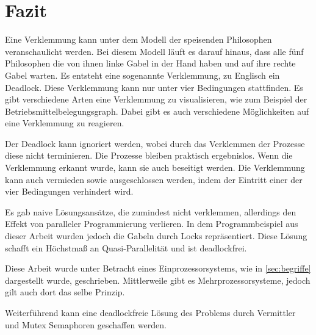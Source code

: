 \chapter{Fazit}
\label{fazit}

Eine Verklemmung kann unter dem Modell der speisenden Philosophen veranschaulicht werden. Bei diesem Modell läuft es darauf hinaus, dass alle fünf Philosophen die von ihnen linke Gabel in der Hand haben und auf ihre rechte Gabel warten. Es entsteht eine sogenannte Verklemmung, zu Englisch ein Deadlock. Diese Verklemmung kann nur unter vier Bedingungen stattfinden. Es gibt verschiedene Arten eine Verklemmung zu visualisieren, wie zum Beispiel der Betriebsmittelbelegungsgraph. Dabei gibt es auch verschiedene Möglichkeiten auf eine Verklemmung zu reagieren. 

Der Deadlock kann ignoriert werden, wobei durch das Verklemmen der Prozesse diese nicht terminieren. Die Prozesse bleiben praktisch ergebnislos. 
Wenn die Verklemmung erkannt wurde, kann sie auch beseitigt werden.
Die Verklemmung kann auch vermieden sowie ausgeschlossen werden, indem der Eintritt einer der vier Bedingungen verhindert wird.

Es gab naive Lösungsansätze, die zumindest nicht verklemmen, allerdings den Effekt von paralleler Programmierung verlieren. 
In dem Programmbeispiel aus dieser Arbeit wurden jedoch die Gabeln durch Locks repräsentiert. Diese Lösung schafft ein Höchstmaß an Quasi-Parallelität und ist deadlockfrei. 

Diese Arbeit wurde unter Betracht eines Einprozessorsystems, wie in \ref{sec:begriffe}  dargestellt wurde, geschrieben. Mittlerweile gibt es Mehrprozessorsysteme, jedoch gilt auch dort das selbe Prinzip.

Weiterführend kann eine deadlockfreie Lösung des Problems durch Vermittler und Mutex Semaphoren geschaffen werden. 